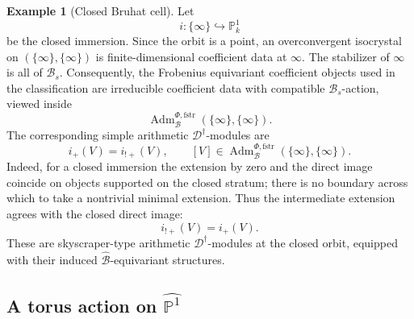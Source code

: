 \documentclass[11pt]{amsart}
\theoremstyle{plain}
\theoremstyle{definition}
\newtheorem{example}{Example}[section]
\theoremstyle{remark}
\newcommand{\fstr}{\mathrm{fstr}}
\newcommand{\Adm}{\operatorname{Adm}}
\begin{document}
\begin{example}[Closed Bruhat cell]
\label{ex:SL2-closed-orbit}
Let
\[
  i:\{\infty\}\hookrightarrow \mathbb P^1_k
\]
be the closed immersion. Since the orbit is a point, an overconvergent
isocrystal on \((\{\infty\},\{\infty\})\) is finite-dimensional coefficient
data at \(\infty\). The stabilizer of \(\infty\) is all of \(\mathcal B_s\).
Consequently, the Frobenius equivariant coefficient objects used in the
classification are irreducible coefficient data with compatible
\(\mathcal B_s\)-action, viewed inside
\[
  \Adm^{\Phi,\fstr}_{\mathcal B}(\{\infty\},\{\infty\}).
\]
The corresponding simple arithmetic \(\mathscr D^\dagger\)-modules are
\[
  i_+(V)=i_{!+}(V),
  \qquad
  [V]\in
  \Adm^{\Phi,\fstr}_{\mathcal B}(\{\infty\},\{\infty\}).
\]
Indeed, for a closed immersion the extension by zero and the direct image
coincide on objects supported on the closed stratum; there is no boundary
across which to take a nontrivial minimal extension. Thus the intermediate
extension agrees with the closed direct image:
\[
  i_{!+}(V)=i_+(V).
\]
These are skyscraper-type arithmetic \(\mathscr D^\dagger\)-modules at the
closed orbit, equipped with their induced \(\widehat{\mathcal B}\)-equivariant
structures.
\end{example}

\subsection{A torus action on \texorpdfstring{\(\widehat{\mathbb P^1}\)}{P1}}
\end{document}

